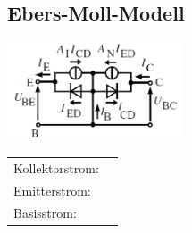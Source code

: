 	\subsection{Ebers-Moll-Modell}
		\begin{minipage}[c]{6cm}
			\includegraphics[width=5.2cm]{images/bipolar-EbersMoll}
		\end{minipage}
		\begin{minipage}[c]{8cm} 
			\begin{tabular}{l l}
			Kollektorstrom: & \fbox{$I_C=A_NI_{E_{sat}}\left(e^{\frac{U_{BE}}{U_T}}-1\right)
			 -I_{C_{sat}}\left(e^{\frac{U_{BC}}{U_T}}-1\right)$ }\\
			Emitterstrom: & \rule{0pt}{6ex}\fbox{$I_E=I_{E_{sat}}\left(e^{\frac{U_{BE}}{U_T}}-1\right)
			 -A_II_{C_{sat}}\left(e^{\frac{U_{BC}}{U_T}}-1\right)$} \\
			Basisstrom: & \rule{0pt}{4ex}\fbox{$I_B=I_E-I_C$} \\
			\end{tabular} 
		\end{minipage}
	

